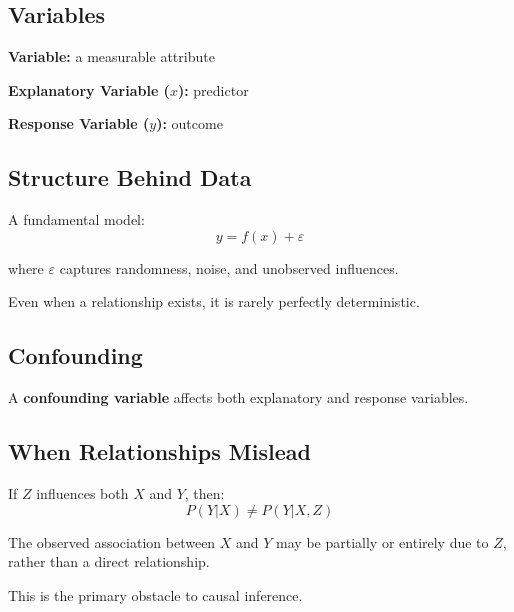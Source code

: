 \documentclass[11pt]{article}
\begin{document}
\begin{tcolorbox}[mybox]
\section*{Variables}

\textbf{Variable:} a measurable attribute  

\textbf{Explanatory Variable ($x$):} predictor  

\textbf{Response Variable ($y$):} outcome  

\subsection*{Structure Behind Data}

A fundamental model:
\[
y = f(x) + \varepsilon
\]

where $\varepsilon$ captures randomness, noise, and unobserved influences.

Even when a relationship exists, it is rarely perfectly deterministic.
\end{tcolorbox}


\begin{tcolorbox}[mybox]
\section*{Confounding}

A \textbf{confounding variable} affects both explanatory and response variables.

\subsection*{When Relationships Mislead}

If $Z$ influences both $X$ and $Y$, then:
\[
P(Y|X) \neq P(Y|X,Z)
\]

The observed association between $X$ and $Y$ may be partially or entirely due to $Z$, rather than a direct relationship.

This is the primary obstacle to causal inference.
\end{tcolorbox}
\end{document}
